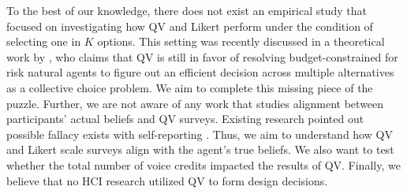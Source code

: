 To the best of our knowledge,
there does not exist an empirical study 
that focused on investigating
how QV and Likert perform
under the condition of selecting
one in $K$ options.
This setting was recently discussed 
in a theoretical work by \textcite{eguia2019quadratic},
who claims that QV is still in favor 
of resolving budget-constrained 
for risk natural agents
to figure out an efficient decision 
across multiple alternatives
as a collective choice problem.
We aim to complete this missing piece of the puzzle.
Further,
we are not aware of any work
that studies alignment between
participants' actual beliefs
and QV surveys.
Existing research pointed out 
possible fallacy exists with self-reporting
\cite{araujo2017much, vavreck2007exaggerated}.
Thus, we aim to understand
how QV and Likert scale surveys
align with the agent's true beliefs.
We also want to test
whether the total number of voice credits 
impacted the results of QV.
Finally, we believe that
no HCI research utilized QV
to form design decisions.